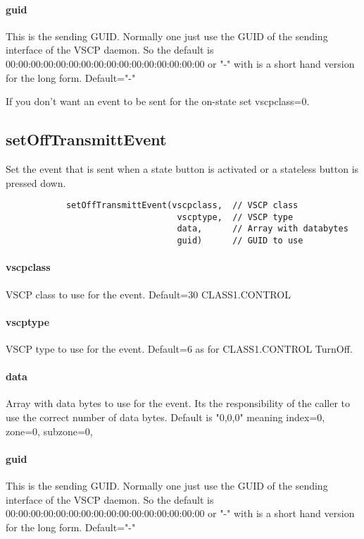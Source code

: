 \documentclass{article}
\begin{document}
        \paragraph*{guid}
        This is the sending GUID. Normally one just use the GUID of the sending 
        interface of the VSCP daemon. So the default is 00:00:00:00:00:00:00:00:00:00:00:00:00:00:00:00
        or "-" with is a short hand version for the long form. Default="-"
        
        If you don't want an event to be sent for the on-state set vscpclass=0.
        
        \subsection*{setOffTransmittEvent}
        Set the event that is sent when a state button is activated or a stateless
        button is pressed down.
        \begin{verbatim}
            setOffTransmittEvent(vscpclass,  // VSCP class
                                  vscptype,  // VSCP type
                                  data,      // Array with databytes   
                                  guid)      // GUID to use
        \end{verbatim}
        \paragraph*{vscpclass}
        VSCP class to use for the event. Default=30 CLASS1.CONTROL
        \paragraph*{vscptype}
        VSCP type to use for the event. Default=6 as for CLASS1.CONTROL TurnOff.
        \paragraph*{data}
        Array with data bytes to use for the event. Its the responsibility
        of the caller to use the correct number of data bytes. Default
        is "0,0,0" meaning index=0, zone=0, subzone=0,
        \paragraph*{guid}
        This is the sending GUID. Normally one just use the GUID of the sending 
        interface of the VSCP daemon. So the default is 00:00:00:00:00:00:00:00:00:00:00:00:00:00:00:00
        or "-" with is a short hand version for the long form. Default="-"
        
\end{document}
